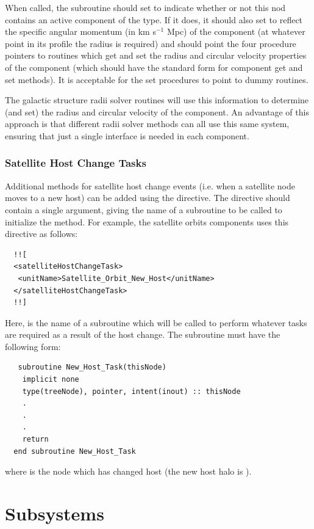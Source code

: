 When called, the subroutine should set  to indicate whether or not this nod contains an active component of the type. If it does, it should also set  to reflect the specific angular momentum (in km s$^{-1}$ Mpc) of the component (at whatever point in its profile the radius is required) and should point the four procedure pointers to routines which get and set the radius and circular velocity properties of the component (which should have the standard form for component get and set methods). It is acceptable for the set procedures to point to dummy routines.

The galactic structure radii solver routines will use this information to determine (and set) the radius and circular velocity of the component. An advantage of this approach is that different radii solver methods can all use this same system, ensuring that just a single interface is needed in each component.

\subsubsection{Satellite Host Change Tasks}

Additional methods for satellite host change events (i.e. when a satellite node moves to a new host) can be added using the  directive. The directive should contain a single argument, giving the name of a subroutine to be called to initialize the method. For example, the  satellite orbits components uses this directive as follows:
\begin{verbatim}
  !![
  <satelliteHostChangeTask>
   <unitName>Satellite_Orbit_New_Host</unitName>
  </satelliteHostChangeTask>
  !!]
\end{verbatim}
Here,  is the name of a subroutine which will be called to perform whatever tasks are required as a result of the host change. The subroutine must have the following form:
\begin{verbatim}
   subroutine New_Host_Task(thisNode)
    implicit none
    type(treeNode), pointer, intent(inout) :: thisNode
    .
    .
    .
    return
  end subroutine New_Host_Task
\end{verbatim}
where  is the node which has changed host (the new host halo is ).

\section{Subsystems}

